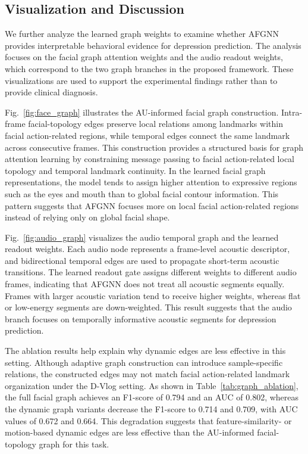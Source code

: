 \documentclass[conference]{IEEEtran}
\begin{document}
\subsection{Visualization and Discussion}

We further analyze the learned graph weights to examine whether AFGNN provides interpretable behavioral evidence for depression prediction. The analysis focuses on the facial graph attention weights and the audio readout weights, which correspond to the two graph branches in the proposed framework. These visualizations are used to support the experimental findings rather than to provide clinical diagnosis.

Fig.~\ref{fig:face_graph} illustrates the AU-informed facial graph construction. Intra-frame facial-topology edges preserve local relations among landmarks within facial action-related regions, while temporal edges connect the same landmark across consecutive frames. This construction provides a structured basis for graph attention learning by constraining message passing to facial action-related local topology and temporal landmark continuity. In the learned facial graph representations, the model tends to assign higher attention to expressive regions such as the eyes and mouth than to global facial contour information. This pattern suggests that AFGNN focuses more on local facial action-related regions instead of relying only on global facial shape.

Fig.~\ref{fig:audio_graph} visualizes the audio temporal graph and the learned readout weights. Each audio node represents a frame-level acoustic descriptor, and bidirectional temporal edges are used to propagate short-term acoustic transitions. The learned readout gate assigns different weights to different audio frames, indicating that AFGNN does not treat all acoustic segments equally. Frames with larger acoustic variation tend to receive higher weights, whereas flat or low-energy segments are down-weighted. This result suggests that the audio branch focuses on temporally informative acoustic segments for depression prediction.


The ablation results help explain why dynamic edges are less effective in this setting. Although adaptive graph construction can introduce sample-specific relations, the constructed edges may not match facial action-related landmark organization under the D-Vlog setting. As shown in Table~\ref{tab:graph_ablation}, the full facial graph achieves an F1-score of 0.794 and an AUC of 0.802, whereas the dynamic graph variants decrease the F1-score to 0.714 and 0.709, with AUC values of 0.672 and 0.664. This degradation suggests that feature-similarity- or motion-based dynamic edges are less effective than the AU-informed facial-topology graph for this task.
\end{document}
